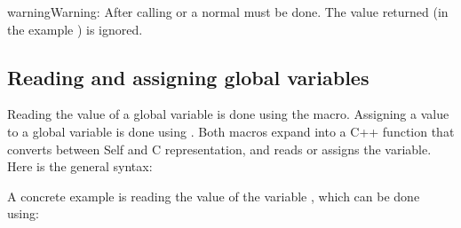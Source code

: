 \documentclass[letterpaper,10pt,english]{sphinxmanual}
\begin{document}
\begin{sphinxadmonition}{warning}{Warning:}
After calling  or  a normal  must be done. The value returned (in the example ) is ignored.
\end{sphinxadmonition}


\subsection{Reading and assigning global variables}
\label{\detokenize{vmref:reading-and-assigning-global-variables}}\label{\detokenize{vmref:index-73}}
Reading the value of a global variable is done using the  macro. Assigning a value to
a global variable is done using . Both macros expand into a C++ function that converts
between Self and C representation, and reads or assigns the variable. Here is the general syntax:

\begin{sphinxVerbatim}[commandchars=\\\{\}]
  
  
\end{sphinxVerbatim}

A concrete example is reading the value of the variable , which can be done using:

\begin{sphinxVerbatim}[commandchars=\\\{\}]
  
\end{sphinxVerbatim}
\end{document}
